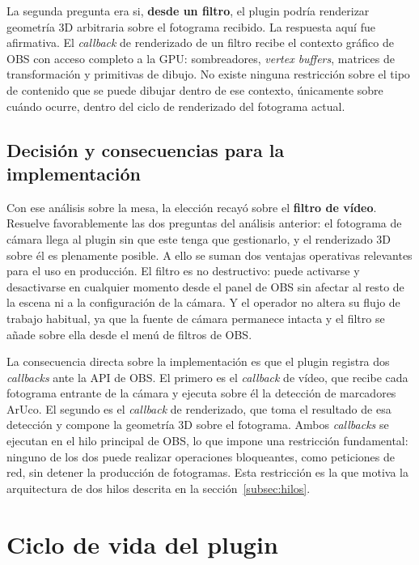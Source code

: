 La segunda pregunta era si, \textbf{desde un filtro}, el plugin podría renderizar geometría 3D arbitraria sobre el fotograma recibido. La respuesta aquí fue afirmativa. El \textit{callback} de renderizado de un filtro recibe el contexto gráfico de OBS con acceso completo a la GPU: sombreadores, \textit{vertex buffers}, matrices de transformación y primitivas de dibujo. No existe ninguna restricción sobre el tipo de contenido que se puede dibujar dentro de ese contexto, únicamente sobre cuándo ocurre, dentro del ciclo de renderizado del fotograma actual.

\subsection{Decisión y consecuencias para la implementación}
\label{subsec:decision_filtro}

Con ese análisis sobre la mesa, la elección recayó sobre el \textbf{filtro de vídeo}. Resuelve favorablemente las dos preguntas del análisis anterior: el fotograma de cámara llega al plugin sin que este tenga que gestionarlo, y el renderizado 3D sobre él es plenamente posible. A ello se suman dos ventajas operativas relevantes para el uso en producción. El filtro es no destructivo: puede activarse y desactivarse en cualquier momento desde el panel de OBS sin afectar al resto de la escena ni a la configuración de la cámara. Y el operador no altera su flujo de trabajo habitual, ya que la fuente de cámara permanece intacta y el filtro se añade sobre ella desde el menú de filtros de OBS.

La consecuencia directa sobre la implementación es que el plugin registra dos \textit{callbacks} ante la API de OBS. El primero es el \textit{callback} de vídeo, que recibe cada fotograma entrante de la cámara y ejecuta sobre él la detección de marcadores ArUco. El segundo es el \textit{callback} de renderizado, que toma el resultado de esa detección y compone la geometría 3D sobre el fotograma. Ambos \textit{callbacks} se ejecutan en el hilo principal de OBS, lo que impone una restricción fundamental: ninguno de los dos puede realizar operaciones bloqueantes, como peticiones de red, sin detener la producción de fotogramas. Esta restricción es la que motiva la arquitectura de dos hilos descrita en la sección~\ref{subsec:hilos}.

\section{Ciclo de vida del plugin}
\label{sec:ciclo_vida}


